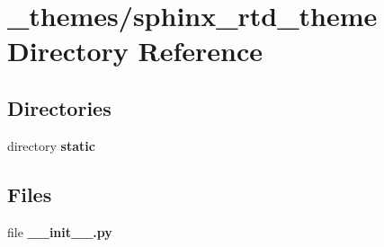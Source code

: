 \section{\-\_\-themes/sphinx\-\_\-rtd\-\_\-theme Directory Reference}
\label{dir_f2b871c1698b29ab9f0fbde336174203}
\subsection*{Directories}
\begin{DoxyCompactItemize}
\item 
directory {\bf static}
\end{DoxyCompactItemize}
\subsection*{Files}
\begin{DoxyCompactItemize}
\item 
file {\bfseries \-\_\-\-\_\-init\-\_\-\-\_\-.\-py}
\end{DoxyCompactItemize}
